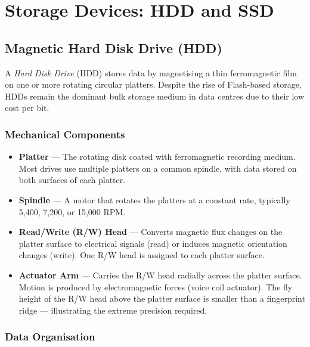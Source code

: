 \documentclass[11pt, a4paper, notitlepage]{report}
\theoremstyle{definition}
\theoremstyle{remark}
\theoremstyle{definition}
\begin{document}
\section{Storage Devices: HDD and SSD}
\label{ch:hdd-ssd}

\subsection{Magnetic Hard Disk Drive (HDD)}
\label{sec:hdd}

A \emph{Hard Disk Drive} (HDD) stores data by magnetising a thin ferromagnetic film on one or more rotating circular platters. Despite the rise of Flash-based storage, HDDs remain the dominant bulk storage medium in data centres due to their low cost per bit.

\subsubsection{Mechanical Components}

\begin{itemize}
  \item \textbf{Platter} — The rotating disk coated with ferromagnetic recording medium. Most drives use multiple platters on a common spindle, with data stored on both surfaces of each platter.
  \item \textbf{Spindle} — A motor that rotates the platters at a constant rate, typically 5{,}400, 7{,}200, or 15{,}000 RPM.
  \item \textbf{Read/Write (R/W) Head} — Converts magnetic flux changes on the platter surface to electrical signals (read) or induces magnetic orientation changes (write). One R/W head is assigned to each platter surface.
  \item \textbf{Actuator Arm} — Carries the R/W head radially across the platter surface. Motion is produced by electromagnetic forces (voice coil actuator). The fly height of the R/W head above the platter surface is smaller than a fingerprint ridge — illustrating the extreme precision required.
\end{itemize}

\subsubsection{Data Organisation}
\label{sec:hdd-organisation}
\end{document}
